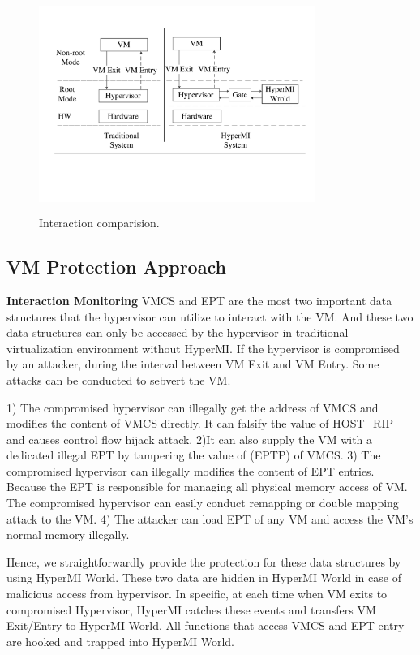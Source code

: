 \documentclass[conference]{IEEEtran}
\begin{document}
\begin{figure}
\centerline{\includegraphics[width=9cm, height=7cm]{pdfvmcsProcess.pdf}}
\caption{Interaction comparision. } \label{fig+1}
\end{figure}


\subsection{VM Protection Approach}

\textbf{Interaction Monitoring}\label {interaction}
 VMCS and EPT are the most two important data structures that the hypervisor can utilize to interact with the VM. And these two data structures can only be accessed by the hypervisor in traditional virtualization environment without HyperMI. If the hypervisor is compromised by an attacker, during the interval between VM Exit and VM Entry. Some attacks can be conducted to sebvert the VM. 

1) The compromised hypervisor can illegally get the address of VMCS and modifies the content of VMCS directly. It can falsify the value of HOST\_RIP and causes control flow hijack attack.
2)It can also supply the VM with a dedicated illegal EPT by tampering the value of (EPTP) of VMCS. 
3) The compromised hypervisor can illegally modifies the content of EPT entries. Because the EPT is responsible for managing all physical memory access of VM. The compromised hypervisor can easily conduct remapping or double mapping attack to the VM.
4) The attacker can load EPT of any VM and access the VM's normal memory illegally.

Hence, we straightforwardly provide the protection for these data structures by using HyperMI World. These two data are hidden in HyperMI World in case of malicious access from hypervisor. In specific, at each time when VM exits to compromised Hypervisor, HyperMI catches these events and transfers VM Exit/Entry to HyperMI World. All functions that access VMCS and EPT entry are hooked and trapped into HyperMI World.
\end{document}

